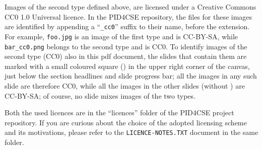 \begin{frame}
{\vspace{1mm}Images of the second type defined above, are licensed under a Creative Commons CC0 1.0 Universal licence. In the PID4CSE repository, the files for these images are identified by appending a ``\texttt{\_cc0}'' suffix to their name, before the extension. For example, \texttt{foo.jpg} is an image of the first type and is CC-BY-SA, while \texttt{bar\_cc0.png} belongs to the second type and is CC0. To identify images of the second type (CC0) also in this pdf document, the slides that contain them are marked with a small coloured square (\TC{$\blacksquare$}) in the upper right corner of the canvas, just below the section headlines and slide progress bar; all the images in any such slide are therefore CC0, while all the images in the other slides (without \TC{$\blacksquare$}) are CC-BY-SA; of course, no slide mixes images of the two types.\par

\vspace{1mm}Both the used licences are in the ``licences'' folder of the PID4CSE project repository. If you are curious about the choice of the adopted licensing scheme and its motivations, please refer to the \texttt{LICENCE-NOTES.TXT} document in the same folder.\par
 }
\end{frame}
